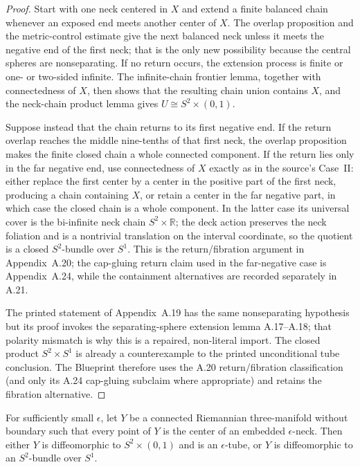 \begin{proof}
Start with one neck centered in $X$ and extend a finite balanced chain whenever
an exposed end meets another center of $X$.  The overlap proposition and the
metric-control estimate give the next balanced neck unless it meets the
negative end of the first neck; that is the only new possibility because the
central spheres are nonseparating.  If no return occurs, the extension process
is finite or one- or two-sided infinite.  The infinite-chain frontier lemma,
together with connectedness of $X$, then shows that the resulting chain union
contains $X$, and the neck-chain product lemma gives
$U\cong S^2\times(0,1)$.

Suppose instead that the chain returns to its first negative end.  If the
return overlap reaches the middle nine-tenths of that first neck, the overlap
proposition makes the finite closed chain a whole connected component.  If the
return lies only in the far negative end, use connectedness of $X$ exactly as
in the source's Case~II: either replace the first center by a center in the
positive part of the first neck, producing a chain containing $X$, or retain a
center in the far negative part, in which case the closed chain is a whole
component.  In the latter case its universal cover is the bi-infinite neck
chain $S^2\times\mathbb R$; the deck action preserves the neck foliation and
is a nontrivial translation on the interval coordinate, so the quotient is a
closed $S^2$-bundle over $S^1$.  This is the return/fibration argument in
Appendix~A.20; the cap-gluing return claim used in the far-negative case is
Appendix~A.24, while the containment alternatives are recorded separately in
A.21.

The printed statement of Appendix~A.19 has the same nonseparating hypothesis
but its proof invokes the separating-sphere extension lemma A.17--A.18; that
polarity mismatch is why this is a repaired, non-literal import.  The closed
product $S^2\times S^1$ is already a counterexample to the printed
unconditional tube conclusion.  The Blueprint therefore uses the A.20
return/fibration classification (and only its A.24 cap-gluing subclaim where
appropriate) and retains the fibration alternative.
\end{proof}

\begin{lemma}
\label{lem:all-neck-component-tube-or-bundle}
\notready
For sufficiently small $\epsilon$, let $Y$ be a connected Riemannian
three-manifold without boundary such that every point of $Y$ is the center of
an embedded $\epsilon$-neck.  Then either $Y$ is diffeomorphic to
$S^2\times(0,1)$ and is an $\epsilon$-tube, or $Y$ is diffeomorphic to an
$S^2$-bundle over $S^1$.
\end{lemma}

